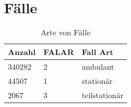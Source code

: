 \section{Fälle}
\begin{center}
 \begin{longtable}{|p{2.3cm}|p{2cm}|p{2.5cm}|}
  \caption{Arte von Fälle} \\
  \hline

\rowcolor{lightgray} Anzahl & FALAR & Fall Art \\ \hline
\endhead
340282 & 2 & ambulant \\ \hline
44507 & 1 & stationär \\ \hline
2067 & 3 & teilstationär \\ \hline
\end{longtable}
\end{center}
